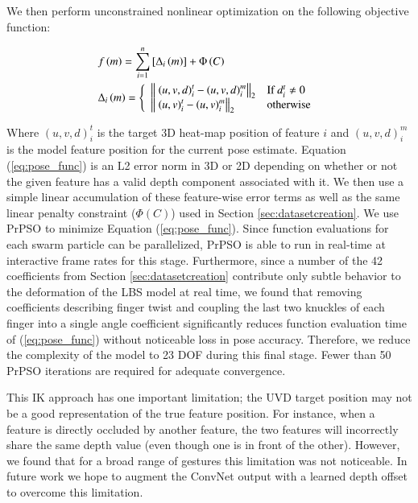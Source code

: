 We then perform unconstrained nonlinear optimization on the following objective function:

\begin{align}
    &f\left(m\right) = \sum\limits_{i=1}^n\left[ \Delta_{i}\left(m\right) \right] + \Phi\left(C\right) \text{   }
    \label{eq:pose_func} \\
    &\Delta_{i}\left(m\right) = \left\{
        \begin{array}{l l}
          \left\|\ \left(u, v, d\right)_i^t - \left(u, v, d\right)_i^m \right\|_2 & \text{If $d_i^t \neq 0$} \\
          \left\|\ \left(u, v\right)_i^t - \left(u, v\right)_i^m \right\|_2 & \text{otherwise}
        \end{array} \right.\ \nonumber
\end{align}

Where $\left(u, v, d\right)_i^t$ is the target 3D heat-map position of feature $i$ and $\left(u, v, d\right)_i^m$ is the model feature position for the current pose estimate. Equation (\ref{eq:pose_func}) is an L2 error norm in 3D or 2D depending on whether or not the given feature has a valid depth component associated with it. We then use a simple linear accumulation of these feature-wise error terms as well as the same linear penalty constraint ($\Phi\left(C\right)$) used in Section \ref{sec:datasetcreation}. We use PrPSO to minimize Equation (\ref{eq:pose_func}). Since function evaluations for each swarm particle can be parallelized, PrPSO is able to run in real-time at interactive frame rates for this stage. Furthermore, since a number of the 42 coefficients from Section \ref{sec:datasetcreation} contribute only subtle behavior to the deformation of the LBS model at real time, we found that removing coefficients describing finger twist and coupling the last two knuckles of each finger into a single angle coefficient significantly reduces function evaluation time of (\ref{eq:pose_func}) without noticeable loss in pose accuracy. Therefore, we reduce the complexity of the model to 23 DOF during this final stage. Fewer than 50 PrPSO iterations are required for adequate convergence.

This IK approach has one important limitation; the UVD target position may not be a good representation of the true feature position. For instance, when a feature is directly occluded by another feature, the two features will incorrectly share the same depth value (even though one is in front of the other). However, we found that for a broad range of gestures this limitation was not noticeable. In future work we hope to augment the ConvNet output with a learned depth offset to overcome this limitation.

